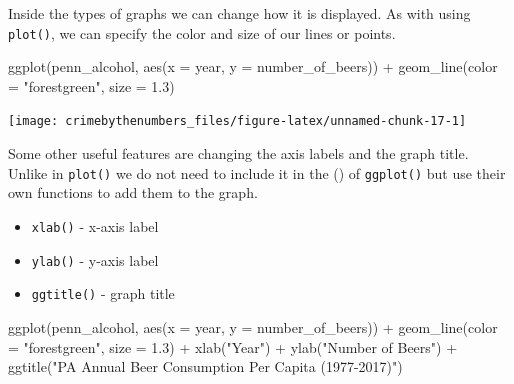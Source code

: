 \documentclass[
  12pt,
  openany]{book}
\newenvironment{Shaded}{\begin{snugshade}}{\end{snugshade}}
\newcommand{\AttributeTok}[1]{\textcolor[rgb]{0.61,0.61,0.61}{#1}}
\newcommand{\FloatTok}[1]{\textcolor[rgb]{0.06,0.06,0.06}{#1}}
\newcommand{\FunctionTok}[1]{\textcolor[rgb]{0,0,0}{#1}}
\newcommand{\NormalTok}[1]{#1}
\newcommand{\SpecialCharTok}[1]{\textcolor[rgb]{0,0,0}{#1}}
\newcommand{\StringTok}[1]{\textcolor[rgb]{0.5,0.5,0.5}{#1}}
\providecommand{\tightlist}{%
  \setlength{\itemsep}{0pt}\setlength{\parskip}{0pt}}
\begin{document}
Inside the types of graphs we can change how it is displayed. As with using \texttt{plot()}, we can specify the color and size of our lines or points.

\begin{Shaded}
\begin{Highlighting}[]
\FunctionTok{ggplot}\NormalTok{(penn\_alcohol, }\FunctionTok{aes}\NormalTok{(}\AttributeTok{x =}\NormalTok{ year, }\AttributeTok{y =}\NormalTok{ number\_of\_beers)) }\SpecialCharTok{+}
  \FunctionTok{geom\_line}\NormalTok{(}\AttributeTok{color =} \StringTok{"forestgreen"}\NormalTok{, }\AttributeTok{size =} \FloatTok{1.3}\NormalTok{)}
\end{Highlighting}
\end{Shaded}

\begin{center}\texttt{[image: crimebythenumbers\_files/figure-latex/unnamed-chunk-17-1]} \end{center}

Some other useful features are changing the axis labels and the graph title. Unlike in \texttt{plot()} we do not need to include it in the () of \texttt{ggplot()} but use their own functions to add them to the graph.

\begin{itemize}
\tightlist
\item
  \texttt{xlab()} - x-axis label
\item
  \texttt{ylab()} - y-axis label
\item
  \texttt{ggtitle()} - graph title
\end{itemize}

\begin{Shaded}
\begin{Highlighting}[]
\FunctionTok{ggplot}\NormalTok{(penn\_alcohol, }\FunctionTok{aes}\NormalTok{(}\AttributeTok{x =}\NormalTok{ year, }\AttributeTok{y =}\NormalTok{ number\_of\_beers)) }\SpecialCharTok{+}
  \FunctionTok{geom\_line}\NormalTok{(}\AttributeTok{color =} \StringTok{"forestgreen"}\NormalTok{, }\AttributeTok{size =} \FloatTok{1.3}\NormalTok{) }\SpecialCharTok{+}
  \FunctionTok{xlab}\NormalTok{(}\StringTok{"Year"}\NormalTok{) }\SpecialCharTok{+}
  \FunctionTok{ylab}\NormalTok{(}\StringTok{"Number of Beers"}\NormalTok{) }\SpecialCharTok{+}
  \FunctionTok{ggtitle}\NormalTok{(}\StringTok{"PA Annual Beer Consumption Per Capita (1977{-}2017)"}\NormalTok{)}
\end{Highlighting}
\end{Shaded}
\end{document}
